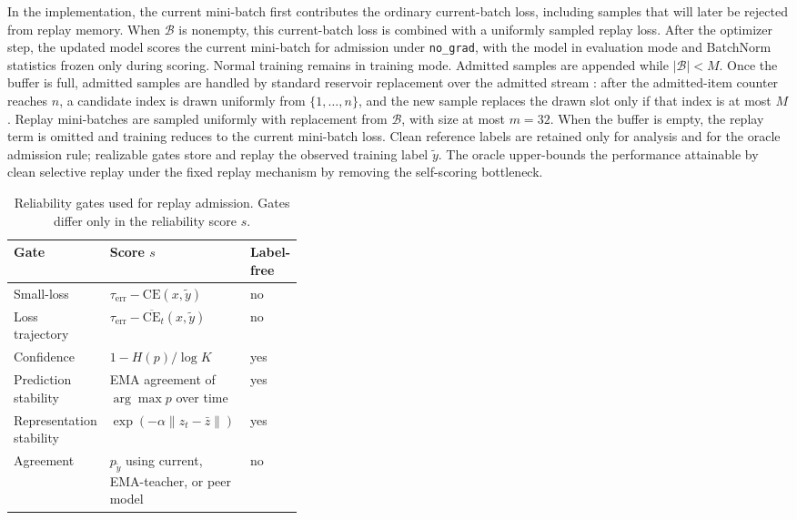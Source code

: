 \documentclass[preprint,12pt]{elsarticle}
\begin{document}
In the implementation, the current mini-batch first contributes the ordinary current-batch loss, including samples that will later be rejected from replay memory. When $\mathcal{B}$ is nonempty, this current-batch loss is combined with a uniformly sampled replay loss. After the optimizer step, the updated model scores the current mini-batch for admission under \texttt{no\_grad}, with the model in evaluation mode and BatchNorm statistics frozen only during scoring. Normal training remains in training mode. Admitted samples are appended while $|\mathcal{B}|<M$. Once the buffer is full, admitted samples are handled by standard reservoir replacement over the admitted stream \cite{Vitter1985Reservoir}: after the admitted-item counter reaches $n$, a candidate index is drawn uniformly from $\{1,\ldots,n\}$, and the new sample replaces the drawn slot only if that index is at most $M$. Replay mini-batches are sampled uniformly with replacement from $\mathcal{B}$, with size at most $m=32$. When the buffer is empty, the replay term is omitted and training reduces to the current mini-batch loss. Clean reference labels are retained only for analysis and for the oracle admission rule; realizable gates store and replay the observed training label $\tilde{y}$. The oracle upper-bounds the performance attainable by clean selective replay under the fixed replay mechanism by removing the self-scoring bottleneck.

\begin{table}[H]
\centering
\caption{Reliability gates used for replay admission. Gates differ only in the reliability score $s$.}
\label{tab:gates}
\small
\begin{tabularx}{\linewidth}{@{}p{0.24\linewidth}Yp{0.13\linewidth}@{}}
\toprule
Gate & Score $s$ & Label-free \\
\midrule
Small-loss &
$\tau_{\mathrm{err}}-\mathrm{CE}(x,\tilde{y})$ &
no \\
Loss trajectory &
$\tau_{\mathrm{err}}-\overline{\mathrm{CE}}_t(x,\tilde{y})$ &
no \\
Confidence &
$1-H(p)/\log K$ &
yes \\
Prediction stability &
EMA agreement of $\arg\max p$ over time &
yes \\
Representation stability &
$\exp(-\alpha\lVert z_t-\bar{z}\rVert)$ &
yes \\
Agreement &
$p_{\tilde{y}}$ using current, EMA-teacher, or peer model &
no \\
\bottomrule
\end{tabularx}
\end{table}
\end{document}
